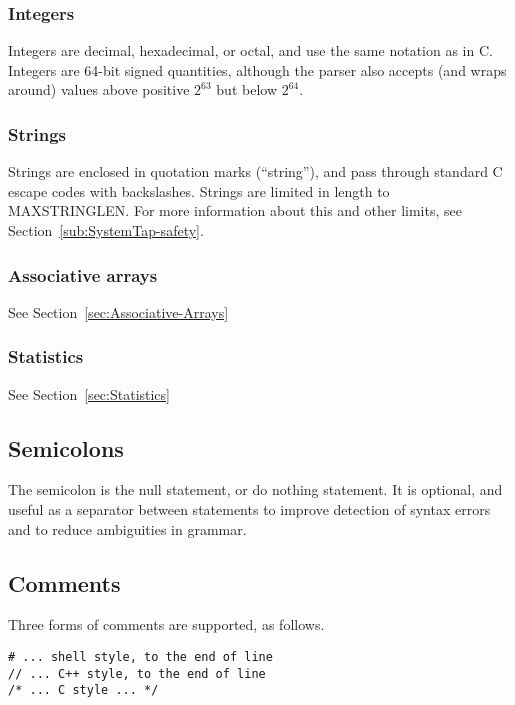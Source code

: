 \documentclass[twoside,english]{article}
\newenvironment{vindent}
{\begin{list}{}{\setlength{\listparindent}{6pt}}
\item[]}
{\end{list}}
\begin{document}
\subsubsection{Integers\label{sub:Integers}}
 
Integers are decimal, hexadecimal, or octal, and use the same notation as
in C. Integers are 64-bit signed quantities, although the parser also accepts
(and wraps around) values above positive $2^{63}$ but below $2^{64}$.


\subsubsection{Strings\label{sub:Strings}}
Strings are enclosed in quotation marks ({}``string''), and pass through
standard C escape codes with backslashes. Strings are limited in length to
MAXSTRINGLEN. For more information about this and other limits, see Section~\ref{sub:SystemTap-safety}.


\subsubsection{Associative arrays}

See Section~\ref{sec:Associative-Arrays}


\subsubsection{Statistics}

See Section~\ref{sec:Statistics}


\subsection{Semicolons}
\index{;}
The semicolon is the null statement, or do nothing statement. It is optional,
and useful as a separator between statements to improve detection of syntax
errors and to reduce ambiguities in grammar.


\subsection{Comments}
Three forms of comments are supported, as follows.

\begin{vindent}
\begin{verbatim}
# ... shell style, to the end of line
// ... C++ style, to the end of line
/* ... C style ... */
\end{verbatim}
\end{vindent}
\end{document}
